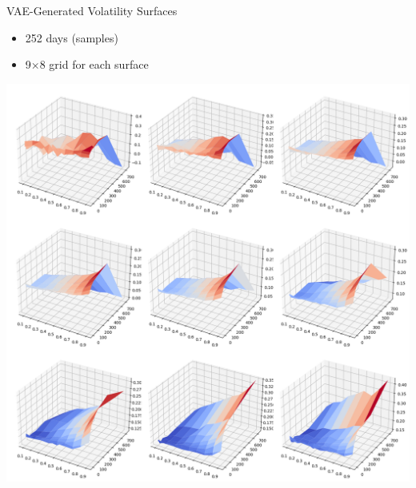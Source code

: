 \documentclass{beamer}
\begin{document}
\begin{frame}{VAE-Generated Volatility Surfaces}
    \begin{minipage}{0.4\linewidth}
        \begin{itemize}
            \item 252 days (samples)
            \item 9×8 grid for each surface
        \end{itemize}
    \end{minipage}%
    \hfill
    \begin{minipage}{0.6\linewidth}
        \centering
        \includegraphics[width=\linewidth]{docs/slides/img/vae_grid_plot_from_5.png}
    \end{minipage}
\end{frame}
\end{document}
